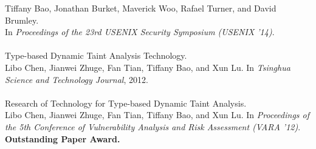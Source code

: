Tiffany Bao, Jonathan Burket, Maverick Woo, Rafael Turner,
and David Brumley.  \\
In \emph{Proceedings of the 23rd USENIX Security Symposium
(USENIX '14)}.
\\\\
%
Type-based Dynamic Taint Analysis Technology. \\
Libo Chen, Jianwei Zhuge, Fan Tian, Tiffany Bao, and Xun Lu.
In \emph{Tsinghua Science and Technology Journal}, 2012.
\\\\
%
Research of Technology for Type-based Dynamic Taint Analysis. \\
Libo Chen, Jianwei Zhuge, Fan Tian, Tiffany Bao, and Xun Lu.
In \emph{Proceedings of the 5th Conference of Vulnerability Analysis
and Risk Assessment (VARA '12)}. \\
\textbf{Outstanding Paper Award.}



